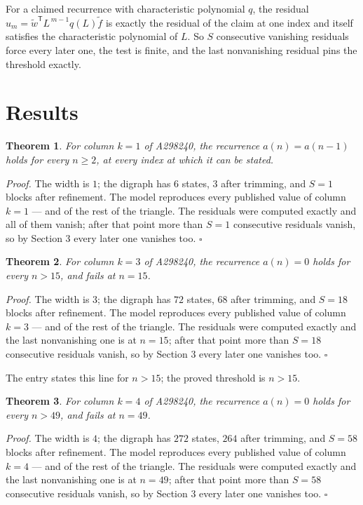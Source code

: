 \documentclass[11pt]{article}
\newtheorem{theorem}{Theorem}
\theoremstyle{definition}
\begin{document}
For a claimed recurrence with characteristic polynomial $q$, the residual $u_m = \tilde w^{\mathsf T}L^{\,m-1}q(L)\tilde f$ is exactly the residual of the claim at one index and itself satisfies the characteristic polynomial of $L$. So $S$ consecutive vanishing residuals force every later one, the test is finite, and the last nonvanishing residual pins the threshold exactly.

\section{Results}

\begin{theorem} For column $k = 1$ of A298240, the recurrence $a(n) = a(n-1)$ holds for every $n \ge 2$, at every index at which it can be stated.\end{theorem}

{\itshape Proof.} The width is $1$; the digraph has $6$ states, $3$ after trimming, and $S = 1$ blocks after refinement. The model reproduces every published value of column $k = 1$ --- and of the rest of the triangle. The residuals were computed exactly and all of them vanish; after that point more than $S = 1$ consecutive residuals vanish, so by Section 3 every later one vanishes too. $\square$

\begin{theorem} For column $k = 3$ of A298240, the recurrence $a(n) = 0$ holds for every $n > 15$, and fails at $n = 15$.\end{theorem}

{\itshape Proof.} The width is $3$; the digraph has $72$ states, $68$ after trimming, and $S = 18$ blocks after refinement. The model reproduces every published value of column $k = 3$ --- and of the rest of the triangle. The residuals were computed exactly and the last nonvanishing one is at $n = 15$; after that point more than $S = 18$ consecutive residuals vanish, so by Section 3 every later one vanishes too. $\square$

The entry states this line for $n > 15$; the proved threshold is $n > 15$.

\begin{theorem} For column $k = 4$ of A298240, the recurrence $a(n) = 0$ holds for every $n > 49$, and fails at $n = 49$.\end{theorem}

{\itshape Proof.} The width is $4$; the digraph has $272$ states, $264$ after trimming, and $S = 58$ blocks after refinement. The model reproduces every published value of column $k = 4$ --- and of the rest of the triangle. The residuals were computed exactly and the last nonvanishing one is at $n = 49$; after that point more than $S = 58$ consecutive residuals vanish, so by Section 3 every later one vanishes too. $\square$
\end{document}
